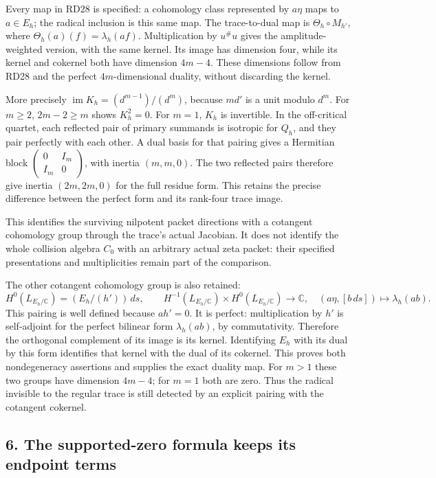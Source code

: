 \documentclass[
  10pt,
  a4paper,
]{article}
\begin{document}
Every map in RD28 is specified: a cohomology class represented by
\(a\eta\) maps to \(a\in E_h\); the radical inclusion is this same map.
The trace-to-dual map is \(\Theta_h\circ M_{h'}\), where
\(\Theta_h(a)(f)=\lambda_h(af)\). Multiplication by \(u^\#u\) gives the
amplitude-weighted version, with the same kernel. Its image has
dimension four, while its kernel and cokernel both have dimension
\(4m-4\). These dimensions follow from RD28 and the perfect
\(4m\)-dimensional duality, without discarding the kernel.

More precisely \(\operatorname{im}K_h=(d^{m-1})/(d^m)\), because
\(m d'\) is a unit modulo \(d^m\). For \(m\ge2\), \(2m-2\ge m\) shows
\(K_h^2=0\). For \(m=1\), \(K_h\) is invertible. In the off-critical
quartet, each reflected pair of primary summands is isotropic for
\(Q_h\), and they pair perfectly with each other. A dual basis for that
pairing gives a Hermitian block
\(\begin{pmatrix}0&I_m\\I_m&0\end{pmatrix}\), with inertia \((m,m,0)\).
The two reflected pairs therefore give inertia \((2m,2m,0)\) for the
full residue form. This retains the precise difference between the
perfect form and its rank-four trace image.

This identifies the surviving nilpotent packet directions with a
cotangent cohomology group through the trace's actual Jacobian. It does
not identify the whole collision algebra \(C_0\) with an arbitrary
actual zeta packet: their specified presentations and multiplicities
remain part of the comparison.

The other cotangent cohomology group is also retained: \[
H^0(L_{E_h/\mathbb C})=(E_h/(h'))\,ds,\qquad
H^{-1}(L_{E_h/\mathbb C})\times H^0(L_{E_h/\mathbb C})
\longrightarrow\mathbb C,\quad (a\eta,[b\,ds])\longmapsto\lambda_h(ab).
\tag{RD28a}
\] This pairing is well defined because \(ah'=0\). It is perfect:
multiplication by \(h'\) is self-adjoint for the perfect bilinear form
\(\lambda_h(ab)\), by commutativity. Therefore the orthogonal complement
of its image is its kernel. Identifying \(E_h\) with its dual by this
form identifies that kernel with the dual of its cokernel. This proves
both nondegeneracy assertions and supplies the exact duality map. For
\(m>1\) these two groups have dimension \(4m-4\); for \(m=1\) both are
zero. Thus the radical invisible to the regular trace is still detected
by an explicit pairing with the cotangent cokernel.

\subsection{6. The supported-zero formula keeps its endpoint
terms}\label{the-supported-zero-formula-keeps-its-endpoint-terms}
\end{document}
